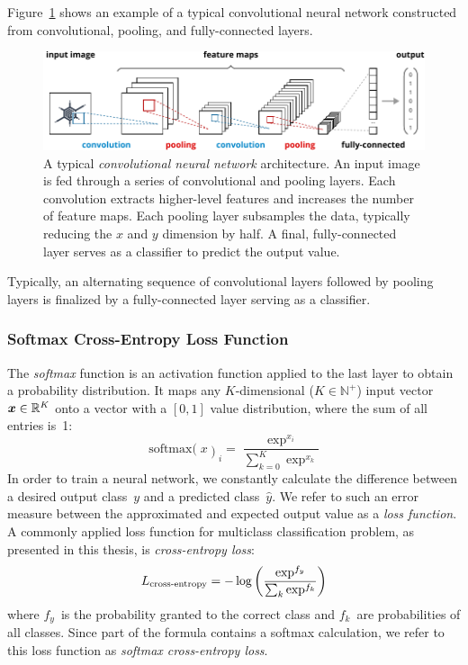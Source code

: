 	Figure~\ref{fig:convnet} shows an example of a typical convolutional neural network constructed from convolutional, pooling, and fully-connected layers.
		\begin{figure}[tp]
  		\centering
    	\includegraphics{img/convnet.pdf}
    	\caption{A typical \emph{convolutional neural network} architecture. An input image is fed through a series of convolutional and pooling layers. Each convolution extracts higher-level features and increases the number of feature maps. Each pooling layer subsamples the data, typically reducing the $x$ and $y$ dimension by half. A final, fully-connected layer serves as a classifier to predict the output value.}
    	\label{fig:convnet}
	\end{figure}
	Typically, an alternating sequence of convolutional layers followed by pooling layers is finalized by a fully-connected layer serving as a  classifier.

\subsubsection{Softmax Cross-Entropy Loss Function}
The \emph{softmax} function is an activation function applied to the last layer to obtain a probability distribution. It maps any $K$-dimensional ($K \in\mathbb{N}^+$) input vector $\boldsymbol{x} \in\mathbb{R}^K$ onto a vector with a $[0, 1]$ value distribution, where the sum of all entries is~\num{1}:
%
$$
\operatorname{softmax(}x\operatorname{)}_i= \frac{\exp^{x_i}}{\sum_{k=0}^K \exp^{x_k}}
$$
%
In order to train a neural network, we constantly calculate the difference between a desired output class~$y$ and a predicted class~$\hat{y}$. We refer to such an error measure between the approximated and expected output value as a \emph{loss function}. A commonly applied loss function for multiclass classification problem, as presented in this thesis, is \emph{cross-entropy loss}:
%
$$
L_\textnormal{cross-entropy} = -\operatorname{log} \left( \frac{\exp^{f_y}}{\sum_k \exp^{f_k}} \right)
$$
%
where $f_y$~is the probability granted to the correct class and $f_k$~are probabilities of all classes. Since part of the formula contains a softmax calculation, we refer to this loss function as \emph{softmax cross-entropy loss}.

